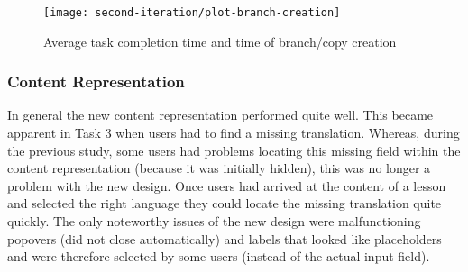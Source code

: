 \begin{figure}[h!]
 \centering
 \texttt{[image: second-iteration/plot-branch-creation]}
 \caption{Average task completion time and time of branch/copy creation}
 \label{fig:avg-time-task1}
\end{figure}

\subsubsection{Content Representation}
In general the new content representation performed quite well. This became apparent in Task 3 when users had to find a missing translation. Whereas, during the previous study, some users had problems locating this missing field within the content representation (because it was initially hidden), this was no longer a problem with the new design. Once users had arrived at the content of a lesson and selected the right language they could locate the missing translation quite quickly. The only noteworthy issues of the new design were malfunctioning popovers (did not close automatically) and labels that looked like placeholders and were therefore selected by some users (instead of the actual input field).





